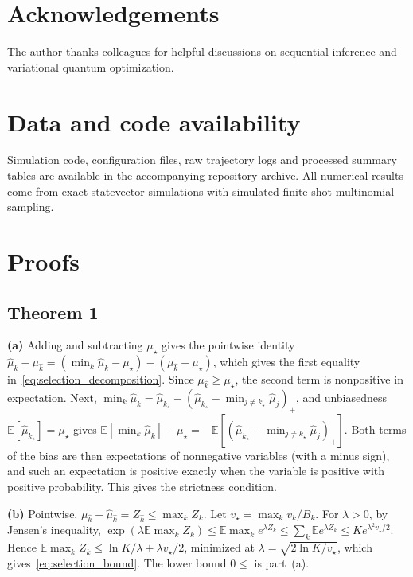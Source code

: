 \documentclass[a4paper,onecolumn,unpublished]{quantumarticle}
\newcommand{\E}{\mathbb{E}}
\begin{document}
\section*{Acknowledgements}
The author thanks colleagues for helpful discussions on sequential inference and variational quantum optimization.

\section*{Data and code availability}
Simulation code, configuration files, raw trajectory logs and processed summary tables are available in the accompanying repository archive. All numerical results come from exact statevector simulations with simulated finite-shot multinomial sampling.

\appendix

\section{Proofs}
\label{app:proofs}

\subsection{Theorem 1}
\label{app:proof_thm1}

\noindent\textbf{(a)} Adding and subtracting $\mu_\star$ gives the pointwise identity $\widehat\mu_{\hat k} - \mu_{\hat k} = (\min_k \widehat\mu_k - \mu_\star) - (\mu_{\hat k} - \mu_\star)$, which gives the first equality in~\eqref{eq:selection_decomposition}. Since $\mu_{\hat k} \ge \mu_\star$, the second term is nonpositive in expectation. Next, $\min_k \widehat\mu_k = \widehat\mu_{k_\star} - (\widehat\mu_{k_\star} - \min_{j\neq k_\star}\widehat\mu_j)_+$, and unbiasedness $\E[\widehat\mu_{k_\star}] = \mu_\star$ gives $\E[\min_k \widehat\mu_k] - \mu_\star = -\E[(\widehat\mu_{k_\star} - \min_{j\neq k_\star}\widehat\mu_j)_+]$. Both terms of the bias are then expectations of nonnegative variables (with a minus sign), and such an expectation is positive exactly when the variable is positive with positive probability. This gives the strictness condition.

\noindent\textbf{(b)} Pointwise, $\mu_{\hat k} - \widehat\mu_{\hat k} = Z_{\hat k} \le \max_k Z_k$. Let $v_\star = \max_k v_k / B_k$. For $\lambda > 0$, by Jensen's inequality, $\exp(\lambda \E \max_k Z_k) \le \E \max_k e^{\lambda Z_k} \le \sum_k \E e^{\lambda Z_k} \le K e^{\lambda^2 v_\star / 2}$. Hence $\E \max_k Z_k \le \ln K / \lambda + \lambda v_\star / 2$, minimized at $\lambda = \sqrt{2\ln K / v_\star}$, which gives~\eqref{eq:selection_bound}. The lower bound $0 \le$ is part~(a).
\end{document}
